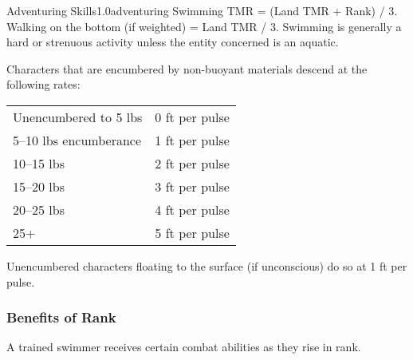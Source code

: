 \begin{skill}{Adventuring Skills}{1.0}{adventuring}
Swimming TMR = (Land TMR + Rank) / 3. Walking on the bottom (if
weighted) = Land TMR / 3.  Swimming is generally a hard or strenuous
activity unless the entity concerned is an aquatic.

Characters that are encumbered by non-buoyant materials descend at the
following rates:
\begin{tabular}{lr}
Unencumbered to 5 lbs	& 0 ft per pulse \\
5--10 lbs encumberance	& 1 ft per pulse \\
10--15 lbs		& 2 ft per pulse \\
15--20 lbs		& 3 ft per pulse \\
20--25 lbs		& 4 ft per pulse \\
25+			& 5 ft per pulse \\
\end{tabular}

Unencumbered characters floating to the surface (\eg if unconscious) do so
at 1 ft per pulse.

\subsubsection{Benefits of Rank}

A trained swimmer receives certain combat abilities as they rise in
rank.

\end{skill}
